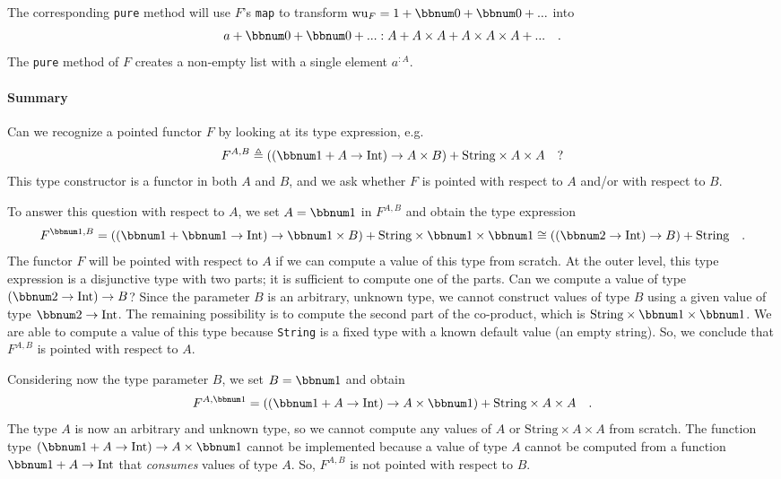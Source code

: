 The corresponding \lstinline!pure! method will use $F$\textsf{'}s \lstinline!map!
to transform $\text{wu}_{F}=1+\bbnum 0+\bbnum 0+...$ into 
\[
a+\bbnum 0+\bbnum 0+...:A+A\times A+A\times A\times A+...\quad.
\]
The \lstinline!pure! method of $F$ creates a non-empty list with
a single element $a^{:A}$.

\paragraph{Summary}

Can we recognize a pointed functor $F$ by looking at its type expression,
e.g.
\[
F^{A,B}\triangleq\left((\bbnum 1+A\rightarrow\text{Int})\rightarrow A\times B\right)+\text{String}\times A\times A\quad?
\]
This type constructor is a functor in both $A$ and $B$, and we ask
whether $F$ is pointed with respect to $A$ and/or with respect to
$B$.

To answer this question with respect to $A$, we set $A=\bbnum 1$
in $F^{A,B}$ and obtain the type expression
\[
F^{\bbnum 1,B}=\left((\bbnum 1+\bbnum 1\rightarrow\text{Int})\rightarrow\bbnum 1\times B\right)+\text{String}\times\bbnum 1\times\bbnum 1\cong\left(\left(\bbnum 2\rightarrow\text{Int}\right)\rightarrow B\right)+\text{String}\quad.
\]
The functor $F$ will be pointed with respect to $A$ if we can compute
a value of this type from scratch. At the outer level, this type expression
is a disjunctive type with two parts; it is sufficient to compute
one of the parts. Can we compute a value of type $\left(\bbnum 2\rightarrow\text{Int}\right)\rightarrow B$?
Since the parameter $B$ is an arbitrary, unknown type, we cannot
construct values of type $B$ using a given value of type $\bbnum 2\rightarrow\text{Int}$.
The remaining possibility is to compute the second part of the co-product,
which is $\text{String}\times\bbnum 1\times\bbnum 1$. We are able
to compute a value of this type because \lstinline!String! is a fixed
type with a known default value (an empty string). So, we conclude
that $F^{A,B}$ is pointed with respect to $A$.

Considering now the type parameter $B$, we set $B=\bbnum 1$ and
obtain
\[
F^{A,\bbnum 1}=\left((\bbnum 1+A\rightarrow\text{Int})\rightarrow A\times\bbnum 1\right)+\text{String}\times A\times A\quad.
\]
The type $A$ is now an arbitrary and unknown type, so we cannot compute
any values of $A$ or $\text{String}\times A\times A$ from scratch.
The function type $(\bbnum 1+A\rightarrow\text{Int})\rightarrow A\times\bbnum 1$
cannot be implemented because a value of type $A$ cannot be computed
from a function $\bbnum 1+A\rightarrow\text{Int}$ that \emph{consumes}
values of type $A$. So, $F^{A,B}$ is not pointed with respect to
$B$.

